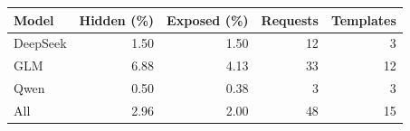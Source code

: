 \begin{tabular}{@{}lrrrr@{}}
\toprule
Model & Hidden (\%) & Exposed (\%) & Requests & Templates\\
\midrule
DeepSeek & 1.50 & 1.50 & 12 & 3\\
GLM & 6.88 & 4.13 & 33 & 12\\
Qwen & 0.50 & 0.38 & 3 & 3\\
\midrule
All & 2.96 & 2.00 & 48 & 15\\
\bottomrule
\end{tabular}
